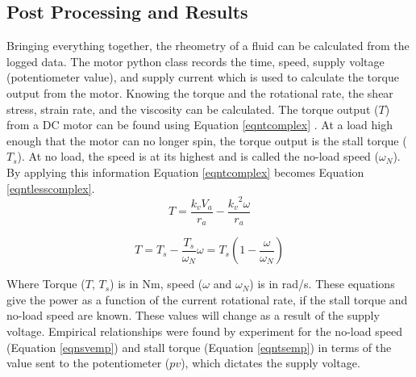 \documentclass[twoside,a4]{report}
\begin{document}
	\subsection*{Post Processing and Results} %
	Bringing everything together, the rheometry of a fluid can be calculated from the logged data. The motor python class records the time, speed, supply voltage (potentiometer value), and supply current which is used to calculate the torque output from the motor. Knowing the torque and the rotational rate, the shear stress, strain rate, and the viscosity can be calculated. The torque output (\(T\)) from a DC motor can be found using Equation \ref{eqntcomplex} \cite[p.~111-112]{backdcmotor}. At a load high enough that the motor can no longer spin, the torque output is the stall torque (\(T_s\)). At no load, the speed is at its highest and is called the no-load speed (\(\omega_N\)). By applying this information Equation \ref{eqntcomplex} becomes Equation \ref{eqntlesscomplex}.
	\begin{equation}
		T = \frac{k_v V_a}{r_a} - \frac{{{k_v}^2} \omega}{r_a}
		\label{eqntcomplex}
	\end{equation}
	
	
	\begin{equation}
		T = T_s - \frac{T_s}{\omega_N} \omega = T_s \left(1 - \frac{\omega}{\omega_N}\right)
		\label{eqntlesscomplex}
	\end{equation}
	
	
	\noindent
	Where Torque (\(T\), \(T_s\)) is in Nm, speed (\(\omega\) and \(\omega_N\)) is in rad/s. These equations give the power as a function of the current rotational rate, if the stall torque and no-load speed are known. These values will change as a result of the supply voltage. Empirical relationships were found by experiment for the no-load speed (Equation \ref{eqnsvemp}) and stall torque (Equation \ref{eqntsemp}) in terms of the value sent to the potentiometer (\(pv\)), which dictates the supply voltage.
	
	
\end{document}
